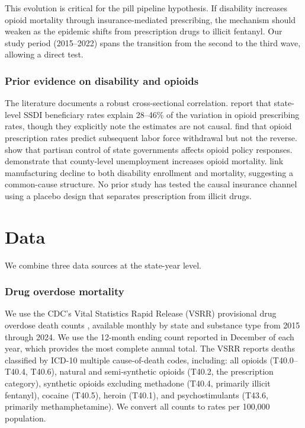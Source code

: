 \documentclass[12pt]{article}
\begin{document}
This evolution is critical for the pill pipeline hypothesis. If disability increases opioid mortality through insurance-mediated prescribing, the mechanism should weaken as the epidemic shifts from prescription drugs to illicit fentanyl. Our study period (2015--2022) spans the transition from the second to the third wave, allowing a direct test.

\subsubsection*{Prior evidence on disability and opioids} The literature documents a robust cross-sectional correlation. \citet{lazo2021} report that state-level SSDI beneficiary rates explain 28--46\% of the variation in opioid prescribing rates, though they explicitly note the estimates are not causal. \citet{currie2019} find that opioid prescription rates predict subsequent labor force withdrawal but not the reverse. \citet{borgschulte2022} show that partisan control of state governments affects opioid policy responses. \citet{hollingsworth2017} demonstrate that county-level unemployment increases opioid mortality. \citet{charles2019} link manufacturing decline to both disability enrollment and mortality, suggesting a common-cause structure. No prior study has tested the causal insurance channel using a placebo design that separates prescription from illicit drugs.

\section{Data}

We combine three data sources at the state-year level.

\subsubsection*{Drug overdose mortality} We use the CDC's Vital Statistics Rapid Release (VSRR) provisional drug overdose death counts \citep{cdc2024vsrr}, available monthly by state and substance type from 2015 through 2024. We use the 12-month ending count reported in December of each year, which provides the most complete annual total. The VSRR reports deaths classified by ICD-10 multiple cause-of-death codes, including: all opioids (T40.0--T40.4, T40.6), natural and semi-synthetic opioids (T40.2, the prescription category), synthetic opioids excluding methadone (T40.4, primarily illicit fentanyl), cocaine (T40.5), heroin (T40.1), and psychostimulants (T43.6, primarily methamphetamine). We convert all counts to rates per 100,000 population.
\end{document}
